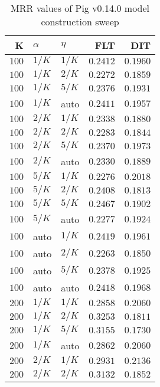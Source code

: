 
\begin{table}
\begin{spacing}{1.2}
\centering
\caption{MRR values of Pig v0.14.0 model construction sweep}
\label{table:pig_model_sweep}
\vspace{0.2em}
\parbox{.45\linewidth}{\centering \begin{tabular}{rll|rr}
\toprule
    K &  $\alpha$ &    $\eta$ & FLT &   DIT \\
\midrule
$100$ &  $1/K$ &  $1/K$ &         $0.2412$ & $0.1960$ \\
$100$ &  $1/K$ &  $2/K$ &         $0.2272$ & $0.1859$ \\
$100$ &  $1/K$ &  $5/K$ &         $0.2376$ & $0.1931$ \\
$100$ &  $1/K$ &   auto &         $0.2411$ & $0.1957$ \\
$100$ &  $2/K$ &  $1/K$ &         $0.2338$ & $0.1880$ \\
$100$ &  $2/K$ &  $2/K$ &         $0.2283$ & $0.1844$ \\
$100$ &  $2/K$ &  $5/K$ &         $0.2370$ & $0.1973$ \\
$100$ &  $2/K$ &   auto &         $0.2330$ & $0.1889$ \\
$100$ &  $5/K$ &  $1/K$ &         $0.2276$ & $0.2018$ \\
$100$ &  $5/K$ &  $2/K$ &         $0.2408$ & $0.1813$ \\
$100$ &  $5/K$ &  $5/K$ &         $0.2467$ & $0.1902$ \\
$100$ &  $5/K$ &   auto &         $0.2277$ & $0.1924$ \\
$100$ &   auto &  $1/K$ &         $0.2419$ & $0.1961$ \\
$100$ &   auto &  $2/K$ &         $0.2263$ & $0.1850$ \\
$100$ &   auto &  $5/K$ &         $0.2378$ & $0.1925$ \\
$100$ &   auto &   auto &         $0.2418$ & $0.1968$ \\
$200$ &  $1/K$ &  $1/K$ &         $0.2858$ & $0.2060$ \\
$200$ &  $1/K$ &  $2/K$ &         $0.3253$ & $0.1811$ \\
$200$ &  $1/K$ &  $5/K$ &         $0.3155$ & $0.1730$ \\
$200$ &  $1/K$ &   auto &         $0.2862$ & $0.2060$ \\
$200$ &  $2/K$ &  $1/K$ &         $0.2931$ & $0.2136$ \\
$200$ &  $2/K$ &  $2/K$ &         $0.3132$ & $0.1852$ \\

\end{tabular}}
\end{spacing}
\end{table}
